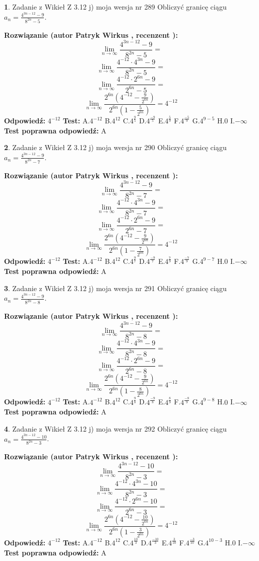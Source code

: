 \documentclass[12pt, a4paper]{article}
\theoremstyle{definition} %
\newtheorem{zad}{}
\newcommand{\zadStart}[1]{\begin{zad}#1\newline}
\newcommand{\zadStop}{\end{zad}}
\newcommand{\rozwStart}[2]{\noindent \textbf{Rozwiązanie (autor #1 , recenzent #2): }\newline}
\newcommand{\rozwStop}{\newline}
\newcommand{\odpStart}{\noindent \textbf{Odpowiedź:}\newline}
\newcommand{\odpStop}{\newline}
\newcommand{\testStart}{\noindent \textbf{Test:}\newline}
\newcommand{\testStop}{\newline}
\newcommand{\kluczStart}{\noindent \textbf{Test poprawna odpowiedź:}\newline}
\newcommand{\kluczStop}{\newline}
\begin{document}
\zadStart{Zadanie z Wikieł Z 3.12 j) moja wersja nr 289}
Obliczyć granicę ciągu $a_{n}=\frac{4^{3n-12}-9}{8^{2n}-5}$.
\zadStop
\rozwStart{Patryk Wirkus}{}
$$\lim\limits_{n\to\infty}\frac{4^{3n-12}-9}{8^{2n}-5}=$$
$$\lim\limits_{n\to\infty}\frac{4^{-12} \cdot 4^{3n}-9}{8^{2n}-5}=$$
$$\lim\limits_{n\to\infty}\frac{4^{-12} \cdot 2^{6n}-9}{2^{6n}-5}=$$
$$\lim\limits_{n\to\infty}\frac{2^{6n}(4^{-12} - \frac{9}{2^{6n}})}{2^{6n}(1-\frac{5}{2^{6n}})}= 4^{-12}$$
\rozwStop
\odpStart
$4^{-12}$
\odpStop
\testStart
A.$4^{-12}$
B.$4^{12}$
C.$4^{\frac{9}{5}}$
D.$4^{\frac{-9}{5}}$
E.$4^{\frac{5}{9}}$
F.$4^{\frac{-5}{9}}$
G.$4^{9-5}$
H.$0$
I.$-\infty$
\testStop
\kluczStart
A
\kluczStop



\zadStart{Zadanie z Wikieł Z 3.12 j) moja wersja nr 290}
Obliczyć granicę ciągu $a_{n}=\frac{4^{3n-12}-9}{8^{2n}-7}$.
\zadStop
\rozwStart{Patryk Wirkus}{}
$$\lim\limits_{n\to\infty}\frac{4^{3n-12}-9}{8^{2n}-7}=$$
$$\lim\limits_{n\to\infty}\frac{4^{-12} \cdot 4^{3n}-9}{8^{2n}-7}=$$
$$\lim\limits_{n\to\infty}\frac{4^{-12} \cdot 2^{6n}-9}{2^{6n}-7}=$$
$$\lim\limits_{n\to\infty}\frac{2^{6n}(4^{-12} - \frac{9}{2^{6n}})}{2^{6n}(1-\frac{7}{2^{6n}})}= 4^{-12}$$
\rozwStop
\odpStart
$4^{-12}$
\odpStop
\testStart
A.$4^{-12}$
B.$4^{12}$
C.$4^{\frac{9}{7}}$
D.$4^{\frac{-9}{7}}$
E.$4^{\frac{7}{9}}$
F.$4^{\frac{-7}{9}}$
G.$4^{9-7}$
H.$0$
I.$-\infty$
\testStop
\kluczStart
A
\kluczStop



\zadStart{Zadanie z Wikieł Z 3.12 j) moja wersja nr 291}
Obliczyć granicę ciągu $a_{n}=\frac{4^{3n-12}-9}{8^{2n}-8}$.
\zadStop
\rozwStart{Patryk Wirkus}{}
$$\lim\limits_{n\to\infty}\frac{4^{3n-12}-9}{8^{2n}-8}=$$
$$\lim\limits_{n\to\infty}\frac{4^{-12} \cdot 4^{3n}-9}{8^{2n}-8}=$$
$$\lim\limits_{n\to\infty}\frac{4^{-12} \cdot 2^{6n}-9}{2^{6n}-8}=$$
$$\lim\limits_{n\to\infty}\frac{2^{6n}(4^{-12} - \frac{9}{2^{6n}})}{2^{6n}(1-\frac{8}{2^{6n}})}= 4^{-12}$$
\rozwStop
\odpStart
$4^{-12}$
\odpStop
\testStart
A.$4^{-12}$
B.$4^{12}$
C.$4^{\frac{9}{8}}$
D.$4^{\frac{-9}{8}}$
E.$4^{\frac{8}{9}}$
F.$4^{\frac{-8}{9}}$
G.$4^{9-8}$
H.$0$
I.$-\infty$
\testStop
\kluczStart
A
\kluczStop



\zadStart{Zadanie z Wikieł Z 3.12 j) moja wersja nr 292}
Obliczyć granicę ciągu $a_{n}=\frac{4^{3n-12}-10}{8^{2n}-3}$.
\zadStop
\rozwStart{Patryk Wirkus}{}
$$\lim\limits_{n\to\infty}\frac{4^{3n-12}-10}{8^{2n}-3}=$$
$$\lim\limits_{n\to\infty}\frac{4^{-12} \cdot 4^{3n}-10}{8^{2n}-3}=$$
$$\lim\limits_{n\to\infty}\frac{4^{-12} \cdot 2^{6n}-10}{2^{6n}-3}=$$
$$\lim\limits_{n\to\infty}\frac{2^{6n}(4^{-12} - \frac{10}{2^{6n}})}{2^{6n}(1-\frac{3}{2^{6n}})}= 4^{-12}$$
\rozwStop
\odpStart
$4^{-12}$
\odpStop
\testStart
A.$4^{-12}$
B.$4^{12}$
C.$4^{\frac{10}{3}}$
D.$4^{\frac{-10}{3}}$
E.$4^{\frac{3}{10}}$
F.$4^{\frac{-3}{10}}$
G.$4^{10-3}$
H.$0$
I.$-\infty$
\testStop
\kluczStart
A
\kluczStop
\end{document}
